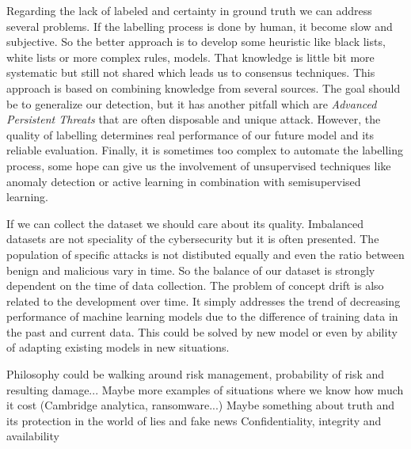 Regarding the lack of labeled and certainty in ground truth we can address several problems. If the labelling process is done by human, it become slow and subjective. So the better approach is to develop some heuristic like black lists, white lists or more complex rules, models. That knowledge is little bit more systematic but still not shared which leads us to consensus techniques. This approach is based on combining knowledge from several sources. The goal should be to generalize our detection, but it has another pitfall which are \emph{Advanced Persistent Threats} that are often disposable and unique attack. However, the quality of labelling determines real performance of our future model and its reliable evaluation. Finally, it is sometimes too complex to automate the labelling process, some hope can give us the involvement of unsupervised techniques like anomaly detection or active learning in combination with semisupervised learning.

If we can collect the dataset we should care about its quality. Imbalanced datasets are not speciality of the cybersecurity but it is often presented. The population of specific attacks is not distibuted equally and even the ratio between benign and malicious vary in time. So the balance of our dataset is strongly dependent on the time of data collection. The problem of concept drift is also related to the development over time. It simply addresses the trend of decreasing performance of machine learning models due to the difference of training data in the past and current data. This could be solved by new model or even by ability of adapting existing models in new situations.







Philosophy could be walking around risk management, probability of risk and resulting damage... Maybe more examples of situations where we know how much it cost (Cambridge analytica, ransomware...)
Maybe something about truth and its protection in the world of lies and fake news
Confidentiality, integrity and availability


